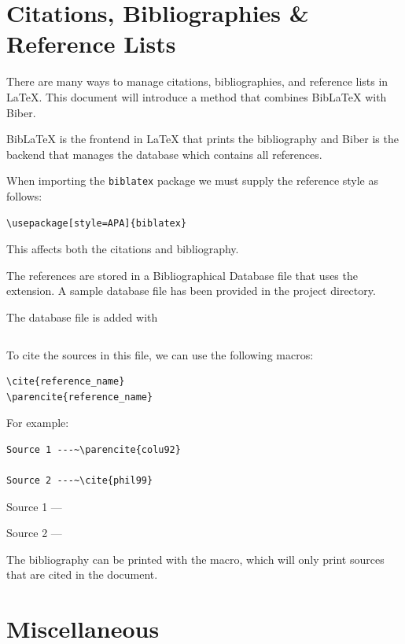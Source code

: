 \documentclass[11pt, twoside]{article}
\begin{document}
\section{Citations, Bibliographies \& Reference Lists}
There are many ways to manage citations, bibliographies, and reference lists in \LaTeX{}. This document will introduce a method that combines BibLaTeX with Biber.

BibLaTeX is the frontend in \LaTeX{} that prints the bibliography and Biber is the backend that manages the database which contains all references.

When importing the \texttt{biblatex} package we must supply the reference style as follows:
\begin{verbatim}
\usepackage[style=APA]{biblatex}
\end{verbatim}
This affects both the citations and bibliography.

The references are stored in a Bibliographical Database file that uses the  extension. A sample database file has been provided in the project directory.

The database file is added with
\begin{verbatim}

\end{verbatim}
To cite the sources in this file, we can use the following macros:
\begin{verbatim}
\cite{reference_name}
\parencite{reference_name}
\end{verbatim}
For example:
\begin{verbatim}
Source 1 ---~\parencite{colu92}

Source 2 ---~\cite{phil99}
\end{verbatim}
\begin{outputbox}
    Source 1 ---~\parencite{colu92}

    Source 2 ---~\cite{phil99}
\end{outputbox}
The bibliography can be printed with the \texttt{\printbibliography} macro, which will only print sources that are cited in the document.
\newpage
\section{Miscellaneous}
\end{document}
